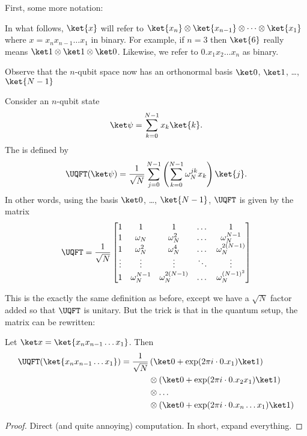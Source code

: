 First, some more notation:
\begin{abuse}
	In what follows, $\ket{x}$ will refer to
	$\ket{x_n} \otimes \ket{x_{n-1}} \otimes \dots \otimes \ket{x_1}$
	where $x = x_n x_{n-1} \dots x_1$ in binary.
	For example, if $n = 3$
	then $\ket{6}$ really means $\ket1 \otimes \ket1 \otimes \ket 0$.
	Likewise, we refer to $0.x_1x_2 \dots x_n$ as binary.
\end{abuse}
Observe that the $n$-qubit space now has an
orthonormal basis $\ket0$, $\ket1$, \dots, $\ket{N-1}$

\begin{definition}
	Consider an $n$-qubit state
	\[ \ket\psi = \sum_{k=0}^{N-1} x_k \ket{k}. \]
	The  is defined by
	\[
		\UQFT(\ket\psi) = \frac{1}{\sqrt N}\sum_{j=0}^{N-1}
		\left( \sum_{k=0}^{N-1} \omega_N^{jk} x_k \right) \ket{j}.
	\]
	In other words, using the basis $\ket0$, \dots, $\ket{N-1}$,
	$\UQFT$ is given by the matrix
	\[
		\UQFT = \frac{1}{\sqrt N}
		\begin{bmatrix}
			1 & 1 & 1 & \dots & 1 \\
			1 & \omega_N & \omega_N^2 & \dots & \omega_N^{N-1} \\
			1 & \omega_N^2 & \omega_N^4 & \dots & \omega_N^{2(N-1)} \\
			\vdots & \vdots & \vdots & \ddots & \vdots \\
			1 & \omega_N^{N-1} & \omega_N^{2(N-1)} & \dots & \omega_N^{(N-1)^2}
		\end{bmatrix}
	\]
\end{definition}
This is the exactly the same definition as before,
except we have a $\sqrt N$ factor added so that $\UQFT$ is unitary.
But the trick is that in the quantum setup, the matrix can be rewritten:
\begin{proposition}
	Let $\ket x = \ket{x_n x_{n-1} \dots x_1}$.
	Then
	\begin{align*}
		\UQFT( \ket{x_n x_{n-1} \dots x_1} )
		= \frac{1}{\sqrt N} &
		\left( \ket0 +\exp(2\pi i \cdot 0.x_1) \ket 1 \right) \\
		&\otimes \left( \ket0 +\exp(2\pi i \cdot 0.x_2x_1) \ket 1 \right) \\
		&\otimes \dots  \\
		&\otimes \left( \ket0 +\exp(2\pi i \cdot 0.x_n\dots x_1) \ket 1 \right)
	\end{align*}
\end{proposition}
\begin{proof}
	Direct (and quite annoying) computation.
	In short, expand everything.
\end{proof}

